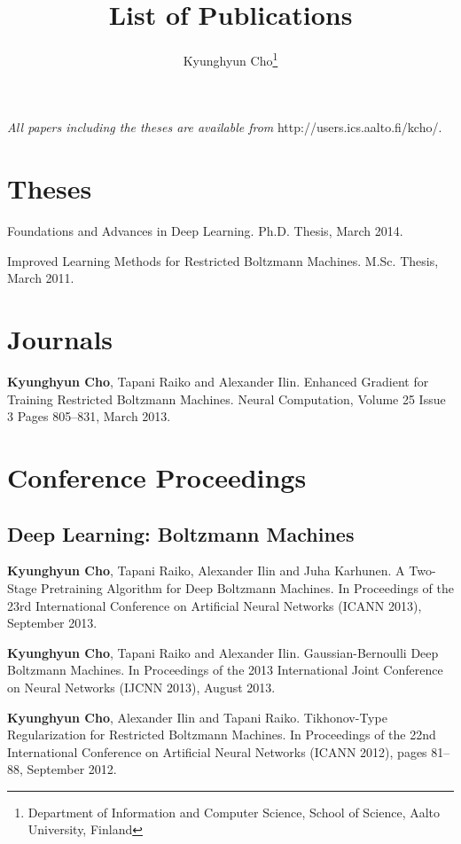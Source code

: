 \documentclass[11pt, oneside]{essay}
\title{List of Publications}
\author{Kyunghyun Cho\thanks{Department of Information and
    Computer Science, School of Science, Aalto University,
             Finland}}
\begin{document}
\maketitle

\vspace{5mm}

\textit{All papers including the theses are available from}
http://users.ics.aalto.fi/kcho/.


\section{Theses}

Foundations and Advances in Deep
Learning. Ph.D. Thesis, March 2014.

Improved Learning Methods for
Restricted Boltzmann Machines. M.Sc. Thesis, March 2011.

\section{Journals}

\textbf{Kyunghyun Cho}, Tapani Raiko and Alexander Ilin. Enhanced
Gradient for Training Restricted Boltzmann Machines. Neural
Computation, Volume 25 Issue 3 Pages 805--831, March 2013.

\section{Conference Proceedings}

\subsection{Deep Learning: Boltzmann Machines}

\textbf{Kyunghyun Cho}, Tapani Raiko, Alexander Ilin and Juha
Karhunen. A Two-Stage Pretraining Algorithm for Deep
Boltzmann Machines. In Proceedings of the 23rd International
Conference on Artificial Neural Networks (ICANN 2013),
September 2013.

\textbf{Kyunghyun Cho}, Tapani Raiko and Alexander Ilin.
Gaussian-Bernoulli Deep Boltzmann Machines. In Proceedings
of the 2013 International Joint Conference on Neural
Networks (IJCNN 2013), August 2013.

\textbf{Kyunghyun Cho}, Alexander Ilin and Tapani Raiko.
Tikhonov-Type Regularization for Restricted Boltzmann
Machines. In Proceedings of the 22nd International
Conference on Artificial Neural Networks (ICANN 2012), pages
81--88, September 2012.
\end{document}
